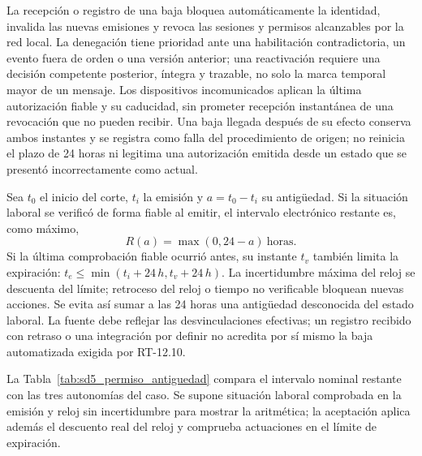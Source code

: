 La recepción o registro de una baja bloquea automáticamente la identidad, invalida las nuevas emisiones y revoca las sesiones y permisos alcanzables por la red local. La denegación tiene prioridad ante una habilitación contradictoria, un evento fuera de orden o una versión anterior; una reactivación requiere una decisión competente posterior, íntegra y trazable, no solo la marca temporal mayor de un mensaje. Los dispositivos incomunicados aplican la última autorización fiable y su caducidad, sin prometer recepción instantánea de una revocación que no pueden recibir. Una baja llegada después de su efecto conserva ambos instantes y se registra como falla del procedimiento de origen; no reinicia el plazo de 24 horas ni legitima una autorización emitida desde un estado que se presentó incorrectamente como actual.

Sea \(t_0\) el inicio del corte, \(t_i\) la emisión y \(a=t_0-t_i\) su antigüedad. Si la situación laboral se verificó de forma fiable al emitir, el intervalo electrónico restante es, como máximo,
\[
R(a)=\max(0,24-a)\ \mbox{horas}.
\]
Si la última comprobación fiable ocurrió antes, su instante \(t_v\) también limita la expiración: \(t_e\leq\min(t_i+24\,h,t_v+24\,h)\). La incertidumbre máxima del reloj se descuenta del límite; retroceso del reloj o tiempo no verificable bloquean nuevas acciones. Se evita así sumar a las 24 horas una antigüedad desconocida del estado laboral. La fuente debe reflejar las desvinculaciones efectivas; un registro recibido con retraso o una integración por definir no acredita por sí mismo la baja automatizada exigida por RT-12.10.

La Tabla~\ref{tab:sd5_permiso_antiguedad} compara el intervalo nominal restante con las tres autonomías del caso. Se supone situación laboral comprobada en la emisión y reloj sin incertidumbre para mostrar la aritmética; la aceptación aplica además el descuento real del reloj y comprueba actuaciones en el límite de expiración.

